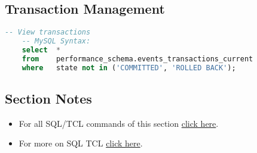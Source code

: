 \subsection{Transaction Management}
\begin{lstlisting}[language=SQL]
	-- View transactions
	-- MySQL Syntax:
	select	*
	from	performance_schema.events_transactions_current
	where	state not in ('COMMITTED', 'ROLLED BACK');
\end{lstlisting}
\subsection{Section Notes}
\begin{itemize}
	\item For all \acs{SQL}/\acs{TCL} commands of this section \href{file:./source-items/sql/5-sql-tcl.sql}{click here}.
	\item For more on \acs{SQL} \acs{TCL} \href{https://dev.mysql.com/doc/refman/8.0/en/sql-transactional-statements.html}{click here}.
\end{itemize}
